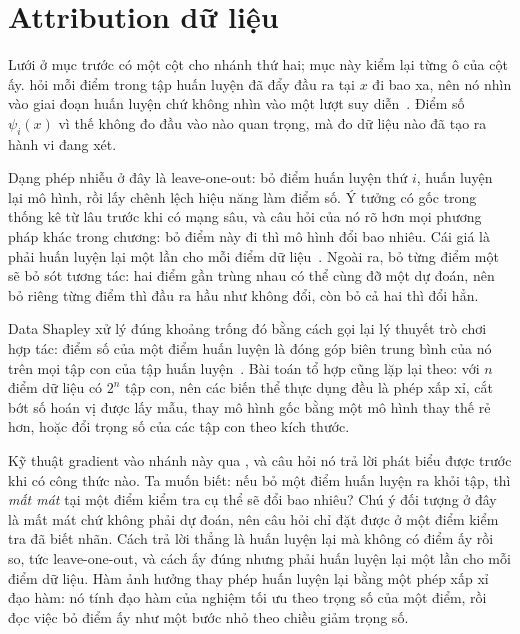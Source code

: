 \section{Attribution dữ liệu}
\label{sec:ch07-attribution-du-lieu}

%
%
Lưới ở mục trước có một cột cho nhánh thứ hai; mục này kiểm lại từng ô của
cột ấy.
 hỏi mỗi điểm trong tập huấn luyện đã
đẩy đầu ra tại $x$ đi bao xa, nên nó nhìn vào giai đoạn huấn luyện chứ không
nhìn vào một lượt suy diễn~\autocite{p18unified}. Điểm số $\psi_i(x)$ vì thế
không đo đầu vào nào quan trọng, mà đo dữ liệu nào đã tạo ra hành vi đang xét.

Dạng phép nhiễu ở đây là leave-one-out: bỏ điểm huấn luyện thứ $i$, huấn luyện
lại mô hình, rồi lấy chênh lệch hiệu năng làm điểm số. Ý tưởng có gốc trong
thống kê từ lâu trước khi có mạng sâu, và câu hỏi
 của nó rõ hơn mọi
phương pháp khác trong chương: bỏ điểm này đi thì mô hình đổi bao nhiêu. Cái
giá là phải huấn luyện lại một lần cho mỗi điểm dữ
liệu~\autocite{p18unified}. Ngoài ra, bỏ từng điểm một sẽ bỏ sót tương tác: hai
điểm gần trùng nhau có thể cùng đỡ một dự đoán, nên bỏ riêng từng điểm thì đầu
ra hầu như không đổi, còn bỏ cả hai thì đổi hẳn.

Data Shapley xử lý đúng khoảng trống đó bằng cách gọi lại lý thuyết trò chơi hợp tác:
điểm số của một điểm huấn luyện là đóng góp biên trung bình của nó trên mọi tập
con của tập huấn luyện~\autocite{p18unified}. Bài toán tổ hợp cũng lặp lại theo:
với $n$ điểm dữ liệu có $2^n$ tập con, nên các biến thể thực dụng đều là phép
xấp xỉ, cắt bớt số hoán vị được lấy mẫu, thay mô hình gốc bằng một mô hình thay
thế rẻ hơn, hoặc đổi trọng số của các tập con theo kích thước.

Kỹ thuật gradient vào nhánh này qua , và
câu hỏi nó trả lời phát biểu được trước khi có công thức nào. Ta muốn biết: nếu
bỏ một điểm huấn luyện ra khỏi tập, thì \emph{mất mát} tại một điểm kiểm tra cụ
thể sẽ đổi bao nhiêu? Chú ý đối tượng ở đây là mất mát chứ không phải dự đoán,
nên câu hỏi chỉ đặt được ở một điểm kiểm tra đã biết nhãn. Cách trả lời thẳng là
huấn luyện lại mà không có điểm ấy rồi so, tức leave-one-out, và cách ấy đúng
nhưng phải huấn luyện lại một lần cho mỗi điểm dữ liệu. Hàm ảnh hưởng thay phép
huấn luyện lại bằng một phép xấp xỉ đạo hàm: nó tính đạo hàm của nghiệm tối ưu
theo trọng số của một điểm, rồi đọc việc bỏ điểm ấy như một bước nhỏ theo chiều
giảm trọng số.

